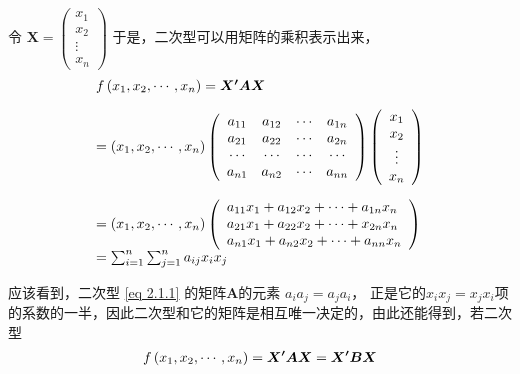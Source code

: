 \begin{enumerate}[ 1) ]
       令 $  \boldsymbol{X} =\left(\begin{array}{c}
       x_{1} \\
       x_{2} \\
       \vdots \\
       x_{n}
       \end{array}\right)  $
       于是，二次型可以用矩阵的乘积表示出来，
       \vspace{-1em}
       \begin{eqnarray}
			\begin{array}{l}
				f\left(x_{1}, x_{2}, \cdots, x_{n}\right) = \boldsymbol{X^{\prime}} \boldsymbol{A} \boldsymbol{X} 
				\vspace{1em}  \\
					=  \left(x_{1}, x_{2}, \cdots, x_{n}\right)\left(
						\begin{array}{cccc}
							a_{11} & a_{12} & \cdots & a_{1 n} \\
							a_{21} & a_{22} & \cdots & a_{2 n} \\
							\cdots & \cdots & \cdots & \cdots \\
							a_{n 1} & a_{n 2} & \cdots & a_{n n}
						\end{array}\right)\left(
						\begin{array}{c}
							x_{1} \\
							x_{2} \\
							\vdots \\
							x_{n}
						\end{array}\right)
       \vspace{1em} \\
					=  \left(x_{1}, x_{2}, \cdots, x_{n}\right)\left(
						\begin{array}{l}
							a_{11} x_{1}+a_{12} x_{2}+\cdots+a_{1 n} x_{n} \\
							a_{21} x_{1}+a_{22} x_{2}+\cdots+x_{2 n} x_{n} \\
							a_{n 1} x_{1}+a_{n 2} x_{2}+\cdots+a_{n n} x_{n}
						\end{array}\right)\\
				=  \sum_{i=1}^{n} \sum_{j=1}^{n} a_{i j} x_{i} x_{j}  \notag
			\end{array}  
        \end{eqnarray}
        
        应该看到，二次型 \eqref{eq 2.1.1} 的矩阵$ \boldsymbol{A} $的元素 $ a_{i}a_{j} = a_{j}a_{i} $，
        正是它的$ x_{i}x_{j} = x_{j}x_{i} $项的系数的一半，因此二次型和它的矩阵是相互唯一决定的，由此还能得到，若二次型
        \begin{eqnarray}
			f\left( x_{1}, x_{2}, \cdots, x_{n}\right)  =  \boldsymbol{X^{\prime}} \boldsymbol{A} \boldsymbol{X}   
			   = \boldsymbol{X^{\prime}} \boldsymbol{B} \boldsymbol{X} \notag
		\end{eqnarray}
		

\end{enumerate}

